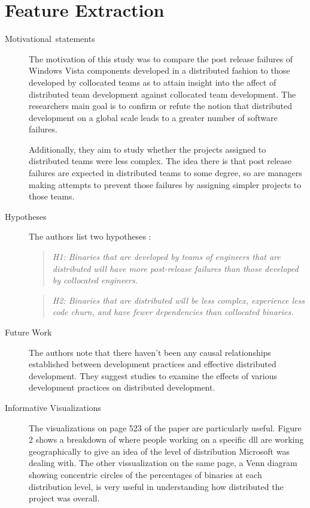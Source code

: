 \documentclass[english]{article}
\begin{document}
\section*{Feature Extraction}
\begin{description}
\item [{Motivational~statements}] The motivation of this study was to compare the post release failures of Windows Vista components developed in a distributed fashion to those developed by collocated teams as to attain insight into the affect of distributed team development against collocated team development. The researchers main goal is to confirm or refute the notion that distributed development on a global scale leads to a greater number of software failures.

Additionally, they aim to study whether the projects assigned to distributed teams were less complex.  The idea there is that post release failures are expected in distributed teams to some degree, so are managers making attempts to prevent those failures by assigning simpler projects to those teams.

\item[Hypotheses] The authors list two hypotheses \cite{bird09}: 
\begin{quote}
\emph{H1: Binaries that are developed by teams of engineers that are distributed will have more post-release failures than those developed by collocated engineers.}
\end{quote}
\begin{quote}
\emph{H2: Binaries that are distributed will be less complex, experience less code churn, and have fewer dependencies than collocated binaries.}
\end{quote}
\item[Future Work] The authors note that there haven't been any causal relationships established between development practices and effective distributed development. They suggest studies to examine the effects of various development practices on distributed development.
\item[Informative Visualizations] The visualizations on page 523 of the paper are particularly useful.  Figure 2 shows a breakdown of where people working on a specific dll are working geographically to give an idea of the level of distribution Microsoft was dealing with.  The other vissualization on the same page, a Venn diagram showing concentric circles of the percentages of binaries at each distribution level, is very useful in understanding how distributed the project was overall.
\end{description}
\end{document}
